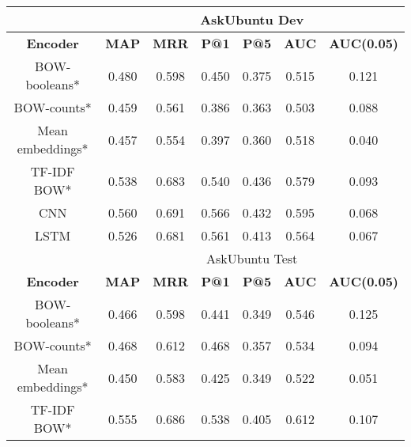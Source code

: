 \documentclass[12pt]{article}
\begin{document}
\begin{center}
		\begin{tabular}{|c||c|c|c|c||c|c|}
			\hline
			\cellcolor{gray!15}
				& \multicolumn{6}{c|}{\cellcolor{gray!15}AskUbuntu Dev} \\ \hline
			\cellcolor{gray!15}\textbf{Encoder} & \cellcolor{gray!15}\textbf{MAP} & \cellcolor{gray!15}\textbf{MRR}
				& \cellcolor{gray!15}\textbf{P@1} & \cellcolor{gray!15}\textbf{P@5}
				& \cellcolor{gray!15}\textbf{AUC} & \cellcolor{gray!15}\textbf{AUC(0.05)} \\ \hline\hline
			\cellcolor{red!15}BOW-booleans* & 0.480 & 0.598 & 0.450 & 0.375 & 0.515 & 0.121 \\ \hline
			\cellcolor{red!15}BOW-counts* & 0.459 & 0.561 & 0.386 & 0.363 & 0.503 & 0.088 \\ \hline
			\cellcolor{red!15}Mean embeddings* & 0.457 & 0.554 & 0.397 & 0.360 & 0.518 & 0.040 \\ \hline
			\cellcolor{red!15}TF-IDF BOW* & 0.538 & 0.683 & 0.540 & 0.436 & 0.579 & 0.093 \\ \hline\hline
			\cellcolor{green!15}CNN & 0.560 & 0.691 & 0.566 & 0.432 & 0.595 & 0.068 \\ \hline
			\cellcolor{green!15}LSTM & 0.526 & 0.681 & 0.561 & 0.413 & 0.564 & 0.067 \\ \hline
			\hline
			\cellcolor{gray!15}
				& \multicolumn{6}{c|}{\cellcolor{gray!15}AskUbuntu Test} \\ \hline
			\cellcolor{gray!15}\textbf{Encoder} & \cellcolor{gray!15}\textbf{MAP} & \cellcolor{gray!15}\textbf{MRR}
				& \cellcolor{gray!15}\textbf{P@1} & \cellcolor{gray!15}\textbf{P@5}
				& \cellcolor{gray!15}\textbf{AUC} & \cellcolor{gray!15}\textbf{AUC(0.05)} \\ \hline\hline
			\cellcolor{red!15}BOW-booleans* & 0.466 & 0.598 & 0.441 & 0.349 & 0.546 & 0.125 \\ \hline
			\cellcolor{red!15}BOW-counts* & 0.468 & 0.612 & 0.468 & 0.357 & 0.534 & 0.094 \\ \hline
			\cellcolor{red!15}Mean embeddings* & 0.450 & 0.583 & 0.425 & 0.349 & 0.522 & 0.051 \\ \hline
			\cellcolor{red!15}TF-IDF BOW* & 0.555 & 0.686 & 0.538 & 0.405 & 0.612 & 0.107 \\ \hline\hline

\end{tabular}
\end{center}
\end{document}
